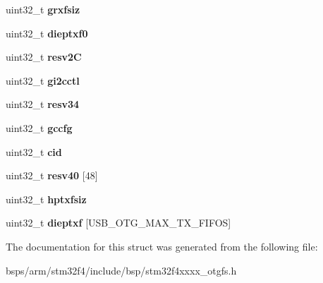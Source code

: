 \begin{DoxyCompactItemize}
\item 
\mbox{\label{structstm32f4__otgfs__s_afeb36df1950dea7ac4248a02a2ae730e}} 
uint32\+\_\+t {\bfseries grxfsiz}
\item 
\mbox{\label{structstm32f4__otgfs__s_a9e1cd7940ebd965ff39da9be143c8962}} 
uint32\+\_\+t {\bfseries dieptxf0}
\item 
\mbox{\label{structstm32f4__otgfs__s_a13daea655938b07013b4f4b92284029f}} 
uint32\+\_\+t {\bfseries resv2C}
\item 
\mbox{\label{structstm32f4__otgfs__s_a85a7d60b72c562881bbd0e33b7798f58}} 
uint32\+\_\+t {\bfseries gi2cctl}
\item 
\mbox{\label{structstm32f4__otgfs__s_ae30cf88b4f31cc878e5fcd85aee61e94}} 
uint32\+\_\+t {\bfseries resv34}
\item 
\mbox{\label{structstm32f4__otgfs__s_ad027acbbf16940b7ab1b84fdf80488a8}} 
uint32\+\_\+t {\bfseries gccfg}
\item 
\mbox{\label{structstm32f4__otgfs__s_a5f0387bfb9083b4ddefe1c14b640ac8c}} 
uint32\+\_\+t {\bfseries cid}
\item 
\mbox{\label{structstm32f4__otgfs__s_a7ff21fdacc82993d5d6c2d3a573f0be9}} 
uint32\+\_\+t {\bfseries resv40} \mbox{[}48\mbox{]}
\item 
\mbox{\label{structstm32f4__otgfs__s_ae52b08d6ca020982fe34860260e0745f}} 
uint32\+\_\+t {\bfseries hptxfsiz}
\item 
\mbox{\label{structstm32f4__otgfs__s_a9ecad9ae04a6f9c01027504fa6ea476b}} 
uint32\+\_\+t {\bfseries dieptxf} \mbox{[}U\+S\+B\+\_\+\+O\+T\+G\+\_\+\+M\+A\+X\+\_\+\+T\+X\+\_\+\+F\+I\+F\+OS\mbox{]}
\end{DoxyCompactItemize}


The documentation for this struct was generated from the following file\+:\begin{DoxyCompactItemize}
\item 
bsps/arm/stm32f4/include/bsp/stm32f4xxxx\+\_\+otgfs.\+h\end{DoxyCompactItemize}

